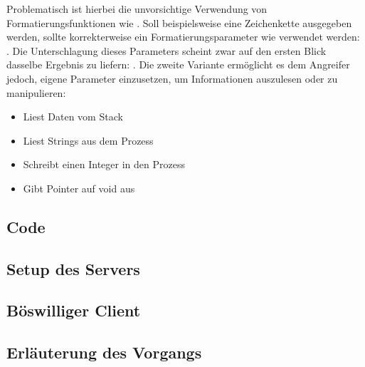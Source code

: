Problematisch ist hierbei die unvorsichtige Verwendung von Formatierungsfunktionen wie .
Soll beispielsweise eine Zeichenkette ausgegeben werden, sollte korrekterweise ein Formatierungsparameter
wie  verwendet werden: . Die Unterschlagung dieses Parameters 
scheint zwar auf den ersten Blick dasselbe Ergebnis zu liefern: . Die zweite Variante ermöglicht
es dem Angreifer jedoch, eigene Parameter einzusetzen, um Informationen auszulesen oder zu manipulieren:
\begin{itemize}
    \item {} Liest Daten vom Stack
    \item {} Liest Strings aus dem Prozess
    \item {} Schreibt einen Integer in den Prozess
    \item {} Gibt Pointer auf void aus
\end{itemize}


\subsection{Code}
\subsection{Setup des Servers}
\subsection{Böswilliger Client}
\subsection{Erläuterung des Vorgangs} \label{explainersub}